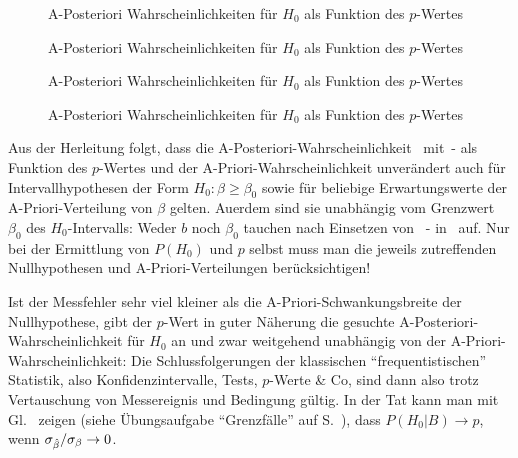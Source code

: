 \begin{figure}
\caption{\label{fig:PriorGauss-1}A-Posteriori
  Wahr\-schein\-lich\-keiten f\"ur $H_0$ als Funktion des $p$-Wertes} 
\end{figure}

\begin{figure}
\caption{\label{fig:PriorGauss-2}A-Posteriori
  Wahr\-schein\-lich\-keiten f\"ur $H_0$ als Funktion des $p$-Wertes} 
\end{figure}

\begin{figure}
\caption{\label{fig:PriorGauss-3}A-Posteriori
  Wahr\-schein\-lich\-keiten f\"ur $H_0$ als Funktion des $p$-Wertes} 
\end{figure}

\begin{figure}
\caption{\label{fig:PriorGauss-4}A-Posteriori
  Wahr\-schein\-lich\-keiten f\"ur $H_0$ als Funktion des $p$-Wertes} 
\end{figure}


\bi
\item Aus der Herleitung folgt, dass die
  A-Posteriori-Wahrscheinlichkeit~ mit~-
als Funktion des $p$-Wertes und der A-Priori-Wahrscheinlichkeit
 unver\"andert auch f\"ur
Intervallhypothesen der Form $H_0: \beta \ge \beta_0$ sowie f\"ur
beliebige Erwartungswerte der A-Priori-Verteilung von $\beta$
gelten. Au\3erdem sind sie unabh\"angig vom Grenzwert  $\beta_0$ des
$H_0$-Intervalls: Weder $b$ noch $\beta_0$ 
tauchen nach Einsetzen von~ -  in~ auf. Nur
bei der Ermittlung von $P(H_0)$ und $p$ selbst muss man die jeweils
zutreffenden Nullhypothesen und A-Priori-Verteilungen
ber\"ucksichtigen! 

\item Ist der Messfehler sehr viel kleiner als die A-Priori-Schwankungsbreite
  der Nullhypothese, gibt der $p$-Wert in guter N\"aherung die gesuchte
  A-Posteriori-Wahr\-schein\-lich\-keit f\"ur $H_0$ an und zwar weitgehend unabh\"angig
  von der A-Priori-Wahr\-schein\-lich\-keit: Die Schlussfolgerungen der
  klassischen ``frequentistischen'' Statistik, also
  Konfidenzintervalle, Tests, $p$-Werte \& Co,
  sind dann also trotz Vertauschung von Messereignis und Bedingung
  g\"ultig. In der Tat kann man mit Gl.~ zeigen (siehe
  \"Ubungsaufgabe ``Grenzf\"alle'' auf S.~\pageref{aufg:Grenzfaelle}), dass $P(H_0| B) 
  \to p$, wenn $\sigma_{\hat{\beta}}/\sigma_{\beta} \to 0$. 

